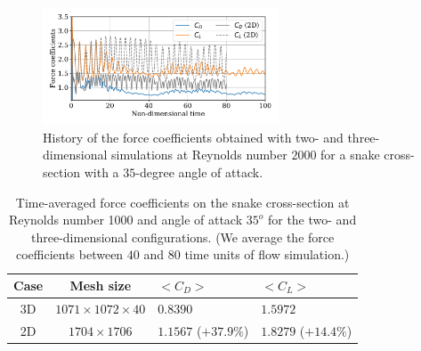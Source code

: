 \documentclass[10pt,journal,compsoc]{IEEEtran}
\begin{document}
\begin{figure}[!ht]
    \centering
    \includegraphics[width=7cm]{figures/forceCoefficientsCompare2D.pdf}
    \caption{History of the force coefficients obtained with two- and three-dimensional simulations at Reynolds number $2000$ for a snake cross-section with a $35$-degree angle of attack.}
    \label{fig:force_coefficients}
\end{figure}

\begin{table}[!t]
    \caption{Time-averaged force coefficients on the snake cross-section at Reynolds number 1000 and angle of attack $35^o$ for the two- and three-dimensional configurations. (We average the force coefficients between $40$ and $80$ time units of flow simulation.)}
    \label{tab:force_coefficients}
    \centering
    \begin{tabular}{ccll}
        \hline
        Case & Mesh size & $<C_D>$ & $<C_L>$ \\
        \hline
        3D & $1071 \times 1072 \times 40$ & $0.8390$ & $1.5972$ \\
        2D & $1704 \times 1706$ & $1.1567$ ($+37.9\%$) & $1.8279$ ($+14.4\%$) \\
        \hline
    \end{tabular}
\end{table}




%
\end{document}
